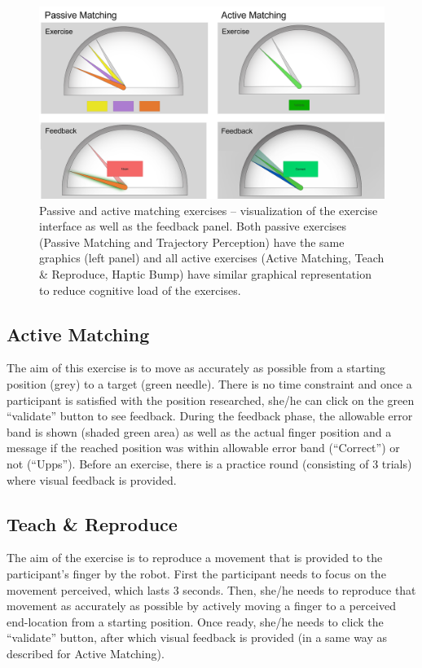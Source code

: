 \documentclass[10pt,oneside,a4paper]{article}
\begin{document}
\begin{figure}[h]
\begin{center}
\includegraphics[width=\columnwidth]{images/Therapy/exercises_explanation_v2.PNG}
\caption{Passive and active matching exercises – visualization of the exercise interface as well as the feedback panel. Both passive exercises (Passive Matching and Trajectory Perception) have the same graphics (left panel) and all active exercises (Active Matching, Teach \& Reproduce, Haptic Bump) have similar graphical representation to reduce cognitive load of the exercises.}
\label{fig:ExerciseExplanation}
\end{center}
\end{figure}

\subsection{Active Matching}
The aim of this exercise is to move as accurately as possible from a starting position (grey) to a target (green needle). There is no time constraint and once a participant is satisfied with the position researched, she/he can click on the green “validate” button to see feedback. During the feedback phase, the allowable error band is shown (shaded green area) as well as the actual finger position and a message if the reached position was within allowable error band (“Correct”) or not (“Upps”). Before an exercise, there is a practice round (consisting of 3 trials) where visual feedback is provided.

\subsection{Teach \& Reproduce}
The aim of the exercise is to reproduce a movement that is provided to the participant’s finger by the robot. First the participant needs to focus on the movement perceived, which lasts 3 seconds. Then, she/he needs to reproduce that movement as accurately as possible by actively moving a finger to a perceived end-location from a starting position. Once ready, she/he needs to click the “validate” button, after which visual feedback is provided (in a same way as described for Active Matching).
\end{document}
